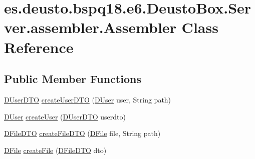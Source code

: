 \hypertarget{classes_1_1deusto_1_1bspq18_1_1e6_1_1_deusto_box_1_1_server_1_1assembler_1_1_assembler}{}\section{es.\+deusto.\+bspq18.\+e6.\+Deusto\+Box.\+Server.\+assembler.\+Assembler Class Reference}
\label{classes_1_1deusto_1_1bspq18_1_1e6_1_1_deusto_box_1_1_server_1_1assembler_1_1_assembler}
\subsection*{Public Member Functions}
\begin{DoxyCompactItemize}
\item 
\mbox{\hyperlink{classes_1_1deusto_1_1bspq18_1_1e6_1_1_deusto_box_1_1_server_1_1dto_1_1_d_user_d_t_o}{D\+User\+D\+TO}} \mbox{\hyperlink{classes_1_1deusto_1_1bspq18_1_1e6_1_1_deusto_box_1_1_server_1_1assembler_1_1_assembler_a9ee0fa62879c38c6e28dc96ff256508e}{create\+User\+D\+TO}} (\mbox{\hyperlink{classes_1_1deusto_1_1bspq18_1_1e6_1_1_deusto_box_1_1_server_1_1jdo_1_1data_1_1_d_user}{D\+User}} user, String path)
\item 
\mbox{\hyperlink{classes_1_1deusto_1_1bspq18_1_1e6_1_1_deusto_box_1_1_server_1_1jdo_1_1data_1_1_d_user}{D\+User}} \mbox{\hyperlink{classes_1_1deusto_1_1bspq18_1_1e6_1_1_deusto_box_1_1_server_1_1assembler_1_1_assembler_a2a91c12219d7625bfa0d43c6425dce9e}{create\+User}} (\mbox{\hyperlink{classes_1_1deusto_1_1bspq18_1_1e6_1_1_deusto_box_1_1_server_1_1dto_1_1_d_user_d_t_o}{D\+User\+D\+TO}} userdto)
\item 
\mbox{\hyperlink{classes_1_1deusto_1_1bspq18_1_1e6_1_1_deusto_box_1_1_server_1_1dto_1_1_d_file_d_t_o}{D\+File\+D\+TO}} \mbox{\hyperlink{classes_1_1deusto_1_1bspq18_1_1e6_1_1_deusto_box_1_1_server_1_1assembler_1_1_assembler_afa6d233d954f6bcc1c5c74473ea726d2}{create\+File\+D\+TO}} (\mbox{\hyperlink{classes_1_1deusto_1_1bspq18_1_1e6_1_1_deusto_box_1_1_server_1_1jdo_1_1data_1_1_d_file}{D\+File}} file, String path)
\item 
\mbox{\hyperlink{classes_1_1deusto_1_1bspq18_1_1e6_1_1_deusto_box_1_1_server_1_1jdo_1_1data_1_1_d_file}{D\+File}} \mbox{\hyperlink{classes_1_1deusto_1_1bspq18_1_1e6_1_1_deusto_box_1_1_server_1_1assembler_1_1_assembler_a6a875bb4b41a886d1c60590795423a96}{create\+File}} (\mbox{\hyperlink{classes_1_1deusto_1_1bspq18_1_1e6_1_1_deusto_box_1_1_server_1_1dto_1_1_d_file_d_t_o}{D\+File\+D\+TO}} dto)

\end{DoxyCompactItemize}
